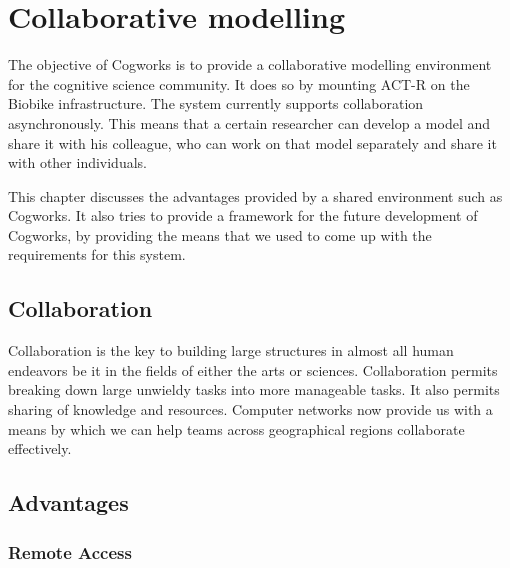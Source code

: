 
\chapter{Collaborative modelling}
\label{chap-four}


The objective of Cogworks is to provide a collaborative modelling
environment for the cognitive science community. It does so by
mounting ACT-R on the Biobike infrastructure. The system currently
supports collaboration asynchronously. This means that a certain
researcher can develop a model and share it with his colleague, who
can work on that model separately and share it with other individuals.

This chapter discusses the advantages provided by a shared environment
such as Cogworks. It also tries to provide a framework for the future
development of Cogworks, by providing the means that we used to come
up with the requirements for this system.

\section{Collaboration}

Collaboration is the key to building large structures in almost all
human endeavors be it in the fields of either the arts or
sciences. Collaboration permits breaking down large unwieldy tasks
into more manageable tasks. It also permits sharing of knowledge and
resources. Computer networks now provide us with a means by which we
can help teams across geographical regions collaborate effectively.



\section{Advantages}

\subsection{Remote Access}


